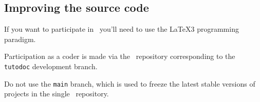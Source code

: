 \documentclass[10pt, a4paper]{tutodoc}
\begin{document}

\subsection{Improving the source code}

\begin{tdocimp}
    If you want to participate in \thisproj\, you'll need to use the \LaTeX3 programming paradigm.
\end{tdocimp}


Participation as a coder is made via the \thisrepo\ repository corresponding to the \verb#tutodoc# development branch.

\begin{tdoccaut}
Do not use the \verb#main# branch, which is used to freeze the latest stable versions of projects in the single \thismonorepo\ repository.
\end{tdoccaut}
\end{document}
